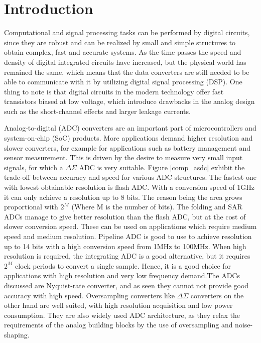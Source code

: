 

\chapter{Introduction}

Computational and signal processing tasks can be performed by digital circuits, since they are robust and can be realized by small and simple structures to obtain complex, fast and accurate systems. As the time passes the speed and density of digital integrated circuits have increased, but the physical world has remained the same, which means that the data converters are still needed to be able to communicate with it by utilizing digital signal processing (DSP). One thing to note is that digital circuits in the modern technology offer fast transistors biased at low voltage, which introduce drawbacks in the analog design such as the short-channel effects and larger leakage currents.  

Analog-to-digital (ADC) converters are an important part of microcontrollers and system-on-chip (SoC) products. More applications demand higher resolution and slower converters, for example for applications such as battery management and sensor measurement. This is driven by the desire to measure very small input signals, for which a $\Delta\Sigma$ ADC is very suitable. Figure \ref{comp_asdc} exhibit  the trade-off between accuracy and speed for various ADC structures. The fastest one with lowest obtainable resolution is flash ADC. With a conversion speed of 1GHz it can only achieve a resolution up to 8 bits. The reason being the area grows proportional with $2^M$ (Where M is the number of bits). The folding and SAR ADCs manage to give better resolution than the flash ADC, but at the cost of slower conversion speed. These can be used on applications which require medium speed and medium resolution. Pipeline ADC is good to use to achieve resolution up to 14 bits with a high conversion speed from 1MHz to 100MHz. When high resolution is required, the integrating ADC is a good alternative, but it requires $2^M$ clock periods to convert a single sample. Hence, it is a good choice for applications with high resolution and very low frequency demand.The ADCs discussed are Nyquist-rate converter, and as seen they cannot not provide good accuracy with high speed.  Oversampling converters like $\Delta\Sigma$ converters on the other hand are well suited, with high resolution acquisition and low power consumption. They are also widely used ADC architecture, as they relax the requirements of the analog building blocks by the use of oversampling and noise-shaping.

